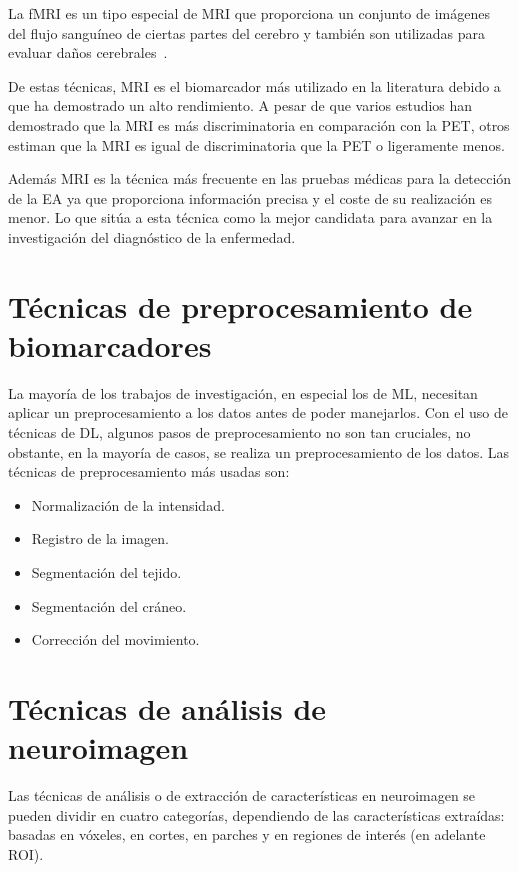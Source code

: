La fMRI es un tipo especial de MRI que proporciona un conjunto de imágenes del flujo sanguíneo de ciertas partes del
cerebro y también son utilizadas para evaluar daños cerebrales~\cite{mayo-clinic-mri}.

De estas técnicas, MRI es el biomarcador más utilizado en la literatura debido a que ha demostrado un alto rendimiento.
A pesar de que varios estudios han demostrado que la MRI es más discriminatoria en comparación con la PET, otros estiman
que la MRI es igual de discriminatoria que la PET o ligeramente menos.

Además MRI es la técnica más frecuente en las pruebas médicas para la detección de la EA ya que proporciona información
precisa y el coste de su realización es menor.
Lo que sitúa a esta técnica como la mejor candidata para avanzar en la investigación del diagnóstico de la enfermedad.

\section{Técnicas de preprocesamiento de biomarcadores}\label{sec:preprocesamiento-estado-del-arte}
La mayoría de los trabajos de investigación, en especial los de ML, necesitan aplicar un preprocesamiento a los datos
antes de poder manejarlos.
Con el uso de técnicas de DL, algunos pasos de preprocesamiento no son tan cruciales, no obstante, en la mayoría de
casos, se realiza un preprocesamiento de los datos.
Las técnicas de preprocesamiento más usadas son:
\begin{itemize}
    \item Normalización de la intensidad.
    \item Registro de la imagen.
    \item Segmentación del tejido.
    \item Segmentación del cráneo.
    \item Corrección del movimiento.\\
\end{itemize}

\section{Técnicas de análisis de neuroimagen}\label{sec:analisis-de neuroimagen-estado-del-arte}
Las técnicas de análisis o de extracción de características en neuroimagen se pueden dividir en cuatro categorías,
dependiendo de las características extraídas: basadas en vóxeles, en cortes, en parches y en regiones de interés
(en adelante ROI).


